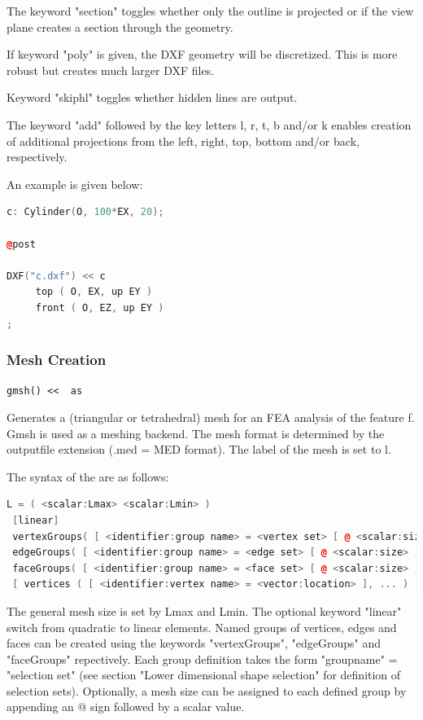 The keyword "section" toggles whether only the outline is projected or
if the view plane creates a section through the geometry.

If keyword "poly" is given, the DXF geometry will be discretized. This
is more robust but creates much larger DXF files.

Keyword "skiphl" toggles whether hidden lines are output.

The keyword "add" followed by the key letters l, r, t, b and/or k
enables creation of additional projections from the left, right, top,
bottom and/or back, respectively.

An example is given below:

\begin{lstlisting}[language=c++]
c: Cylinder(O, 100*EX, 20);

@post

DXF("c.dxf") << c
     top ( O, EX, up EY )
     front ( O, EZ, up EY )
;
\end{lstlisting}


\subsubsection{Mesh Creation}
\texttt{gmsh() \textless\textless { } as  }

Generates a (triangular or tetrahedral) mesh for an FEA analysis of the
feature f. Gmsh is used as a meshing backend. The mesh format is
determined by the outputfile extension (.med = MED format). The label of
the mesh is set to l.

The syntax of the  are as follows:

\begin{lstlisting}[language=c++]
L = ( <scalar:Lmax> <scalar:Lmin> )  
 [linear]  
 vertexGroups( [ <identifier:group name> = <vertex set> [ @ <scalar:size> ], ... ] )  
 edgeGroups( [ <identifier:group name> = <edge set> [ @ <scalar:size> ], ... ] )  
 faceGroups( [ <identifier:group name> = <face set> [ @ <scalar:size> ], ... ] )  
 [ vertices ( [ <identifier:vertex name> = <vector:location> ], ... ) ]
\end{lstlisting}
  

The general mesh size is set by Lmax and Lmin. The optional keyword
"linear" switch from quadratic to linear elements. Named groups of
vertices, edges and faces can be created using the keywords
"vertexGroups", "edgeGroups" and "faceGroups" repectively. Each group
definition takes the form "groupname" = "selection set" (see section
"Lower dimensional shape selection" for definition of selection sets). Optionally, a mesh
size can be assigned to each defined group by appending an @ sign
followed by a scalar value.

